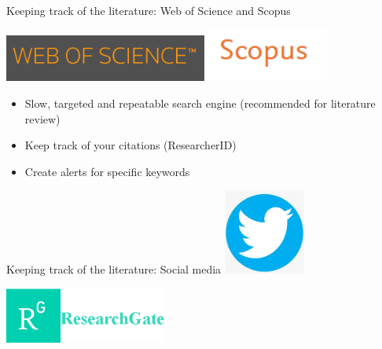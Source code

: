 \documentclass[10pt]{beamer}%
\begin{document}
\begin{frame}{Keeping track of the literature: Web of Science and Scopus}

    \includegraphics[width=0.5\textwidth]{Figures/wos}
    \includegraphics[width=0.3\textwidth]{Figures/scopus}
    
    \begin{itemize}
   \item Slow, targeted and repeatable search engine (recommended for literature review)
    \item Keep track of your citations (ResearcherID)
    \item Create alerts for specific keywords
 \end{itemize}

\end{frame}


\begin{frame}{Keeping track of the literature: Social media}
\centering
    \includegraphics[width=0.2\textwidth]{Figures/tweeter}
    
    \includegraphics[width=0.4\textwidth]{Figures/resgate}
\end{frame}
\end{document}
